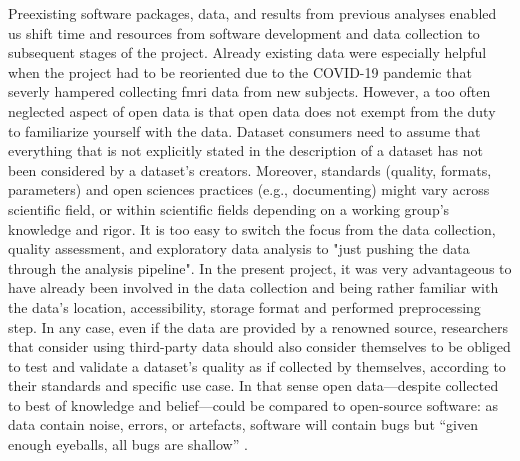 %
Preexisting software packages, data, and results from previous analyses enabled
us shift time and resources from software development and data collection to
subsequent stages of the project.
%
Already existing data were especially helpful when the project had to be
reoriented due to the COVID-19 pandemic that severly hampered collecting
\ac{fmri} data from new subjects.
%
However, a too often neglected aspect of open data is that open data does not
exempt from the duty to familiarize yourself with the data.
Dataset consumers need to assume that everything that is not explicitly stated
in the description of a dataset has not been considered by a dataset's creators.
%
Moreover, standards (quality, formats, parameters) and open sciences practices
(e.g., documenting) might vary across scientific field, or within scientific
fields depending on a working group's knowledge and rigor.
%
It is too easy to switch the focus from the data collection, quality assessment,
and exploratory data analysis to "just pushing the data through the analysis
pipeline".
%
In the present project, it was very advantageous to have already been involved
in the data collection and being rather familiar with the data's location,
accessibility, storage format and performed preprocessing step.
In any case, even if the data are provided by a renowned source, researchers
that consider using third-party data should also consider themselves to be
obliged to test and validate a dataset's quality as if collected by themselves,
according to their standards and specific use case.
%
In that sense open data---despite collected to best of knowledge and
belief---could be compared to open-source software:
%
as data contain noise, errors, or artefacts, software will contain bugs but
``given enough eyeballs, all bugs are shallow'' \citep[][p.
30]{raymond1999cathedral}.





